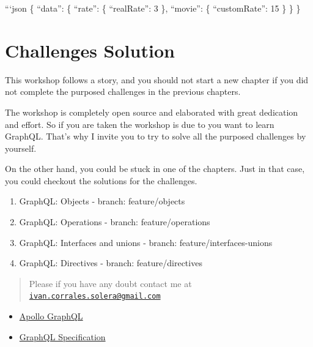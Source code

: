 \documentclass[]{book}
\providecommand{\tightlist}{%
  \setlength{\itemsep}{0pt}\setlength{\parskip}{0pt}}
\begin{document}
```json \{ ``data'': \{ ``rate'': \{ ``realRate'': 3 \}, ``movie'': \{
``customRate'': 15 \} \} \}

\chapter{Challenges Solution}\label{challenges-solution}

This workshop follows a story, and you should not start a new chapter if
you did not complete the purposed challenges in the previous chapters.

The workshop is completely open source and elaborated with great
dedication and effort. So if you are taken the workshop is due to you
want to learn GraphQL. That's why I invite you to try to solve all the
purposed challenges by yourself.

On the other hand, you could be stuck in one of the chapters. Just in
that case, you could checkout the solutions for the challenges.

\begin{enumerate}
\def\labelenumi{\arabic{enumi}.}
\setcounter{enumi}{3}
\tightlist
\item
  GraphQL: Objects - branch: feature/objects
\item
  GraphQL: Operations - branch: feature/operations
\item
  GraphQL: Interfaces and unions - branch: feature/interfaces-unions
\item
  GraphQL: Directives - branch: feature/directives
\end{enumerate}

\begin{quote}
Please if you have any doubt contact me at
\href{mailto:ivan.corrales.solera@gmail.com}{\nolinkurl{ivan.corrales.solera@gmail.com}}
\end{quote}

\begin{itemize}
\tightlist
\item
  \href{https://www.apollographql.com/docs/}{Apollo GraphQL}
\item
  \href{https://facebook.github.io/graphql/}{GraphQL Specification}
\end{itemize}
\end{document}
